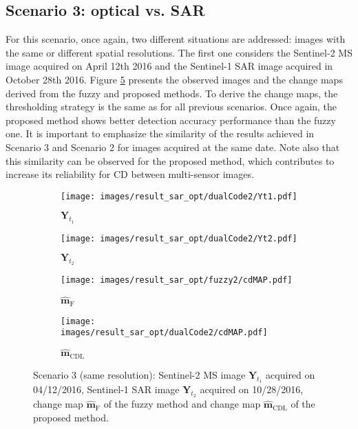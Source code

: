\documentclass[review]{elsarticle}
\begin{document}
\subsection{Scenario 3: optical vs. SAR}

For this scenario, once again, two different situations are addressed: images with the same or different spatial resolutions. The first one considers the Sentinel-2 MS image acquired on April 12th 2016 and the Sentinel-1 SAR image acquired in  October 28th 2016. Figure \ref{fig:realS1S2_2} presents the observed images and the change maps derived from the fuzzy and proposed methods. To derive the change maps, the thresholding strategy is the same as for all previous scenarios. Once again, the proposed method shows better detection accuracy performance than the fuzzy one. It is important to emphasize the similarity of the results achieved in Scenario 3 and Scenario 2 for images acquired at the same date. Note also that this similarity can be observed for the proposed method, which contributes to increase its reliability for CD between multi-sensor images.

\begin{figure}[h!]
\centering
			\begin{subfigure}{\subfwidth}
					\centering
					\texttt{[image: images/result\_sar\_opt/dualCode2/Yt1.pdf]}
					\caption{$\mathbf{Y}_{t_1}$}
					\label{fig:s1s2Yt1_2}
			\end{subfigure}
			\begin{subfigure}{\subfwidth}
					\centering
					\texttt{[image: images/result\_sar\_opt/dualCode2/Yt2.pdf]}
					\caption{$\mathbf{Y}_{t_2}$}
					\label{fig:s1s2Yt2_2}
			\end{subfigure}
            \begin{subfigure}{\subfwidth}
					\centering
					\texttt{[image: images/result\_sar\_opt/fuzzy2/cdMAP.pdf]}
					\caption{$\hat{\mathbf{m}}_{\mathrm{F}}$}
					\label{fig:s1s2FMAP_2}
			\end{subfigure}
			\begin{subfigure}{\subfwidth}
					\centering
					\texttt{[image: images/result\_sar\_opt/dualCode2/cdMAP.pdf]}
					\caption{$\hat{\mathbf{m}}_{\mathrm{CDL}}$}
					\label{fig:s1s2DCMAP_2}
			\end{subfigure}
\caption{Scenario 3 (same resolution): \protect{}  Sentinel-2 MS image $\mathbf{Y}_{t_1}$ acquired on 04/12/2016, \protect{}  Sentinel-1 SAR image $\mathbf{Y}_{t_2}$ acquired on 10/28/2016, \protect{} change map $\hat{\mathbf{m}}_{\mathrm{F}}$ of the fuzzy method and \protect{} change map $\hat{\mathbf{m}}_{\mathrm{CDL}}$ of the proposed method.}%
	\label{fig:realS1S2_2}%
\end{figure}
\end{document}
